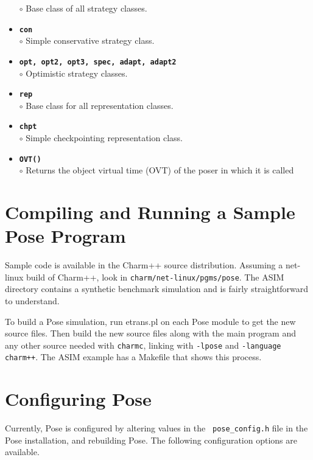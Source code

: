 \documentclass[10pt]{article}
\newcommand{\pose}{{\sc Pose}}
\begin{document}
\begin{itemize}
	$\circ$ Base class of all strategy classes.
\item {\tt {\bf con}}\\
	$\circ$ Simple conservative strategy class.
\item {\tt {\bf opt, opt2, opt3, spec, adapt, adapt2}}\\
	$\circ$ Optimistic strategy classes.
\item {\tt {\bf rep}}\\
	$\circ$ Base class for all representation classes.
\item {\tt {\bf chpt}}\\
	$\circ$ Simple checkpointing representation class.
\item {\tt {\bf OVT()}}\\
	$\circ$ Returns the object virtual time (OVT) of the poser in
	which it is called
\end{itemize}

\section{Compiling and Running a Sample \pose{} Program}

Sample code is available in the Charm++ source distribution.  Assuming a
net-linux build of Charm++, look in {\tt charm/net-linux/pgms/pose}.
The ASIM directory contains a synthetic benchmark simulation and is
fairly straightforward to understand.

To build a \pose{} simulation, run {etrans.pl} on each \pose{} module
to get the new source files.  Then build the new source files along with the
main program and any other source needed with {\tt charmc}, linking
with {\tt -lpose} and {\tt -language charm++}.  The ASIM example has a
Makefile that shows this process.

\section{Configuring \pose{}}

Currently, \pose{} is configured by altering values in the {\tt
pose\_config.h} file in the \pose{} installation, and rebuilding
\pose{}.  The following configuration options are available.
\end{document}
